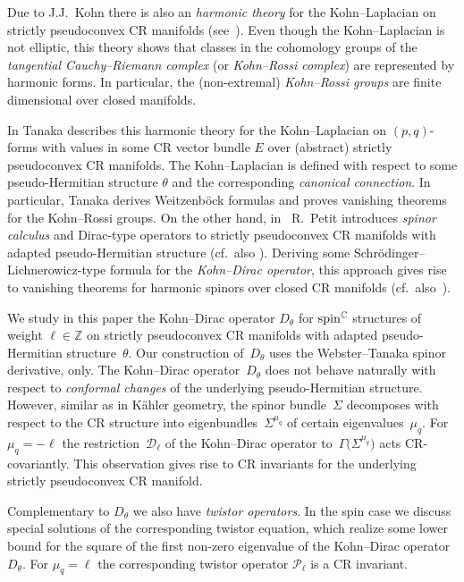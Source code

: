 \documentclass[pdftex]{sigma}
\numberwithin{equation}{section}
\newcommand{\ZZ}{\mathbb{Z}}
\newcommand{\CC}{\mathbb{C}}
\begin{document}
Due to J.J.~Kohn there is also an {\em harmonic theory} for the Kohn--Laplacian on strictly pseudoconvex CR manifolds (see~\cite{FK,Koh}). Even though the Kohn--Laplacian is not elliptic, this theory shows that classes in the cohomology groups of the {\em tangential Cauchy--Riemann complex} (or {\em Kohn--Rossi complex}) are represented by harmonic forms. In particular, the (non-extremal) {\em Kohn--Rossi groups} are finite dimensional over closed manifolds.

In \cite{Tan} Tanaka describes this harmonic theory for the Kohn--Laplacian on $(p,q)$-forms with values in some CR vector bundle $E$
over (abstract) strictly pseudoconvex CR manifolds.
The Kohn--Laplacian is defined with respect to some pseudo-Hermitian structure $\theta$ and the corresponding {\em canonical connection}.
In particular, Tanaka derives Weitzenb\"ock formulas and proves vanishing theorems
for the Kohn--Rossi groups. On the other hand, in~\cite{Pet} R.~Petit introduces {\em spinor calculus} and Dirac-type operators to strictly pseudoconvex CR manifolds
with adapted pseudo-Hermitian structure (cf.~also \cite{LeiN1, Stadt}). Deriving some Schr\"odinger--Lichnerowicz-type formula
for the {\em Kohn--Dirac operator}, this approach gives rise to vanishing theorems for harmonic spinors over closed CR manifolds (cf.\ also~\cite{Kor}).

We study in this paper the Kohn--Dirac operator $D_\theta$ for ${\rm spin}^\CC$ structures of weight \mbox{$\ell\in\ZZ$}
on strictly pseudoconvex CR manifolds with adapted pseudo-Hermitian
structure~$\theta$. Our construction of~$D_\theta$ uses the Webster--Tanaka spinor derivative, only.
The Kohn--Dirac operator~$D_\theta$ does not behave naturally with respect to {\em conformal changes}
of the underlying pseudo-Hermitian structure. However, similar as in K\"ahler geometry, the spinor bundle~$\Sigma$ decomposes with respect to the CR structure
into eigenbundles~$\Sigma^{\mu_q}$
of certain eigenvalues~$\mu_q$. For $\mu_q=-\ell$ the restriction~$\mathcal{D}_\ell$ of the Kohn--Dirac operator to~$\Gamma\big(\Sigma^{\mu_q}\big)$
acts CR-covariantly.
This observation gives rise to CR invariants for the underlying strictly pseudoconvex CR manifold.

Complementary to $D_\theta$ we also have {\em twistor operators}.
In the spin case \cite{LeiN1} we discuss special solutions of the corresponding twistor equation, which realize
some lower bound for the square of the first non-zero eigenvalue of the Kohn--Dirac operator $D_\theta$.
For $\mu_q=\ell$ the corresponding twistor operator $\mathcal{P}_\ell$ is a CR invariant.
\end{document}
